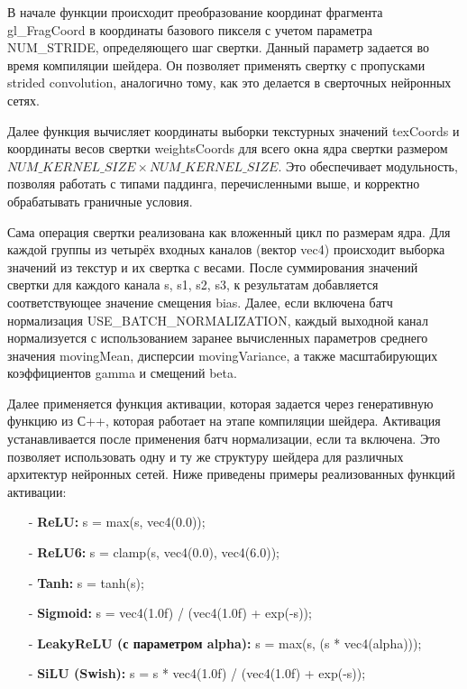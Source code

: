 \documentclass[a4paper,14pt]{extreport}
\begin{document}
            В начале функции происходит преобразование координат фрагмента gl\_FragCoord в координаты базового пикселя с учетом параметра NUM\_STRIDE, определяющего шаг свертки. Данный параметр задается во время компиляции шейдера. Он позволяет применять свертку с пропусками strided convolution, аналогично тому, как это делается в сверточных нейронных сетях.
            
            Далее функция вычисляет координаты выборки текстурных значений texCoords и координаты весов свертки weightsCoords для всего окна ядра свертки размером $NUM\_KERNEL\_SIZE \times NUM\_KERNEL\_SIZE$. Это обеспечивает модульность, позволяя работать с типами паддинга, перечисленными выше, и корректно обрабатывать граничные условия.
            
            Сама операция свертки реализована как вложенный цикл по размерам ядра. Для каждой группы из четырёх входных каналов (вектор vec4) происходит выборка значений из текстур и их свертка с весами. После суммирования значений свертки для каждого канала s, s1, s2, s3, к результатам добавляется соответствующее значение смещения bias. Далее, если включена батч нормализация USE\_BATCH\_NORMALIZATION, каждый выходной канал нормализуется с использованием заранее вычисленных параметров среднего значения movingMean, дисперсии movingVariance, а также масштабирующих коэффициентов gamma и смещений beta.
    
            Далее применяется функция активации, которая задается через генеративную функцию из С++, которая работает на этапе компиляции шейдера. Активация устанавливается после применения батч нормализации, если та включена. Это позволяет использовать одну и ту же структуру шейдера для различных архитектур нейронных сетей. Ниже приведены примеры реализованных функций активации:
            \begin{itemize}
                \item[-] \textbf{ReLU:} s = max(s, vec4(0.0));
                \item[-] \textbf{ReLU6:} s = clamp(s, vec4(0.0), vec4(6.0));
                \item[-] \textbf{Tanh:} s = tanh(s);
                \item[-] \textbf{Sigmoid:} s = vec4(1.0f) / (vec4(1.0f) + exp(-s));
                \item[-] \textbf{LeakyReLU (с параметром alpha):} s = max(s, (s * vec4(alpha)));
                \item[-] \textbf{SiLU (Swish):} s = s * vec4(1.0f) / (vec4(1.0f) + exp(-s));
            \end{itemize}
            
\end{document}
